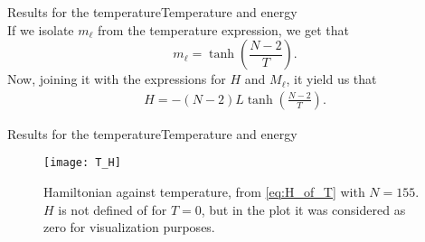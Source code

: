 \begin{frame}{Results for the temperature}{Temperature and energy}
	\setlength\fboxrule{0.5pt}
	\setlength\fboxsep{4pt}
\\[1em]

	If we isolate $m_\ell$ from the temperature expression, we get that 	
\begin{equation}
    m_\ell = \tanh \left(\frac{N-2}{T}\right).\label{eq:ml_of_T}
\end{equation}
Now, joining it with the expressions for $H$ and $M_\ell$, it yield us that
\begin{align}
    H = -(N-2)L\tanh \left(\frac{N-2}{T}\right). \label{eq:H_of_T}
\end{align}
\end{frame}

\begin{frame}{Results for the temperature}{Temperature and energy}
	\begin{figure}[h]
	    \centering
		\texttt{[image: T\_H]}
	    \caption{Hamiltonian against temperature, from \cref{eq:H_of_T} with $N=155$. $H$ is not defined of for $T=0$, but in the plot it was considered as zero for visualization purposes.}
	    \label{fig:T_H_out}
	\end{figure}    
\end{frame}


